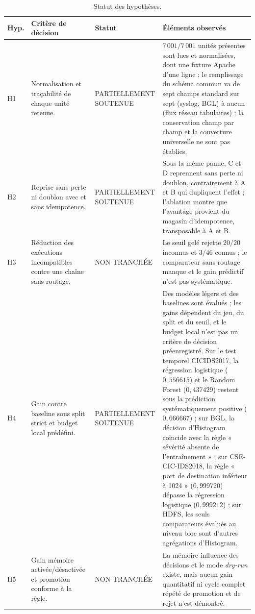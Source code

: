 \begin{table}[H]

\centering

\caption{Statut des hypothèses.}

\label{tab:statut-hypotheses}

\scriptsize
\begin{tabularx}{\textwidth}{p{} p{} p{} X}

\toprule

\textbf{Hyp.} & \textbf{Critère de décision} & \textbf{Statut} & \textbf{Éléments observés} \\

\midrule

H1 & Normalisation et traçabilité de chaque unité retenue. &
PARTIELLEMENT SOUTENUE &
$7\,001/7\,001$ unités présentes sont lues et normalisées, dont une fixture Apache d'une ligne ; le remplissage du schéma commun va de sept champs standard sur sept (syslog, BGL) à aucun (flux réseau tabulaires) ; la conservation champ par champ et la couverture universelle ne sont pas établies. \\

H2 & Reprise sans perte ni doublon avec et sans idempotence. &
PARTIELLEMENT SOUTENUE &
Sous la même panne, C et D reprennent sans perte ni doublon, contrairement à A et B qui dupliquent l'effet ; l'ablation montre que l'avantage provient du magasin d'idempotence, transposable à A et B. \\

H3 & Réduction des exécutions incompatibles contre une chaîne sans routage. &
NON TRANCHÉE &
Le seuil gelé rejette $20/20$ inconnus et $3/46$ connus ; le comparateur sans routage manque et le gain prédictif n'est pas systématique. \\

H4 & Gain contre baseline sous split strict et budget local prédéfini. &
PARTIELLEMENT SOUTENUE &
Des modèles légers et des baselines sont évalués ; les gains dépendent du jeu, du split et du seuil, et le budget local n'est pas un critère de décision préenregistré. Sur le test temporel CICIDS2017, la régression logistique ($0{,}556615$) et le Random Forest ($0{,}437429$) restent sous la prédiction systématiquement positive ($0{,}666667$) ; sur BGL, la décision d'Histogram coïncide avec la règle « sévérité absente de l'entraînement » ; sur CSE-CIC-IDS2018, la règle « port de destination inférieur à 1024 » ($0{,}999720$) dépasse la régression logistique ($0{,}999212$) ; sur HDFS, les seuls comparateurs évalués au niveau bloc sont d'autres agrégations d'Histogram. \\

H5 & Gain mémoire activée/désactivée et promotion conforme à la règle. &
NON TRANCHÉE &
La mémoire influence des décisions et le mode \textit{dry-run} existe, mais aucun gain quantitatif ni cycle complet répété de promotion et de rejet n'est démontré. \\

\bottomrule

\end{tabularx}

\end{table}
